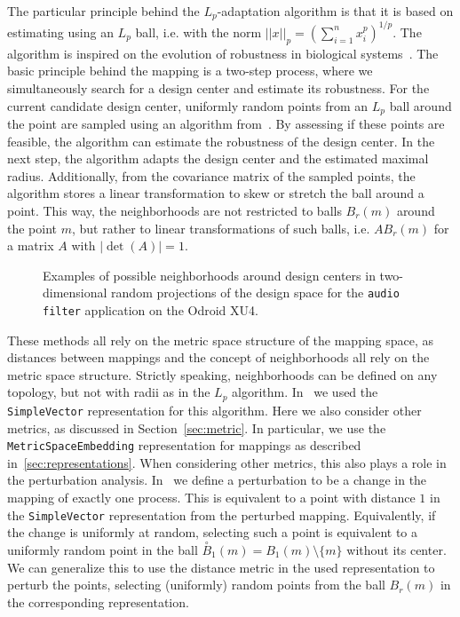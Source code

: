 The particular principle behind the $L_p$-adaptation algorithm is that it is based on estimating using an $L_p$ ball, i.e. with the norm $||x||_p = (\sum_{i=1}^n x_i^p)^{1/p}$.
The algorithm is inspired on the evolution of robustness in biological systems~\cite{asmus2017lp}.
The basic principle behind the mapping is a two-step process, where we simultaneously search for a design center and estimate its robustness.
For the current candidate design center, uniformly random points from an $L_p$ ball around the point are sampled using an algorithm from~\cite{calafiore1998uniform}.
By assessing if these points are feasible, the algorithm can estimate the robustness of the design center.
In the next step, the algorithm adapts the design center and the estimated maximal radius.
Additionally, from the covariance matrix of the sampled points, the algorithm stores a linear transformation to skew or stretch the ball around a point.
This way, the neighborhoods are not restricted to balls $B_r(m)$ around the point $m$, but rather to linear transformations of such balls, i.e. $A B_r(m)$ for a matrix $A$ with $|\operatorname{det}(A)| = 1$.

\begin{figure}[h]
	\centering
	\caption{Examples of possible neighborhoods around design centers in two-dimensional random projections of the design space for the \texttt{audio filter} application on the Odroid XU4.}
	\label{fig:design_centering_exynos}
\end{figure}

These methods all rely on the metric space structure of the mapping space, as distances between mappings and the concept of neighborhoods all rely on the metric space structure.
Strictly speaking, neighborhoods can be defined on any topology, but not with radii as in the $L_p$ algorithm.
In~\cite{hempel_scopes17} we used the \texttt{SimpleVector} representation for this algorithm.
Here we also consider other metrics, as discussed in Section~\ref{sec:metric}.
In particular, we use the \texttt{MetricSpaceEmbedding} representation for mappings as described in~\ref{sec:representations}.
When considering other metrics, this also plays a role in the perturbation analysis.
In~\cite{hempel_scopes17} we define a perturbation to be a change in the mapping of exactly one process.
This is equivalent to a point with distance $1$ in the \texttt{SimpleVector} representation from the perturbed mapping.
Equivalently, if the change is uniformly at random, selecting such a point is equivalent to a uniformly random point in the ball $\overset{\circ}{B}_1(m) = B_1(m) \setminus \{ m \}$ without its center.
We can generalize this to use the distance metric in the used representation to perturb the points, selecting (uniformly) random points from the ball $B_r(m)$ in the corresponding representation.

